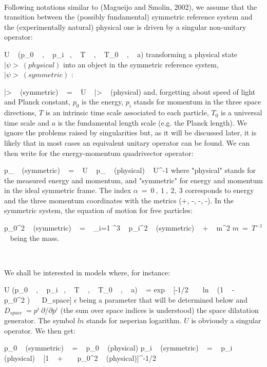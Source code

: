 \documentclass[a4paper,12pt,dvips]{article}
\begin{document}
~ 

Following notations similar to (Magueijo and Smolin, 2002), we assume that the transition between the (possibly fundamental) symmetric reference system and the (experimentally natural) physical one is driven by a singular non-unitary operator:

\equation
U ~ (p_0 ~ , ~ p_i ~, ~ T ~ , ~ T_0 ~ , ~ a) 
\endequation
\noindent
transforming a physical state $|\psi> ~ (physical)$ into an object in the symmetric reference system, $|\psi> ~ (symmetric)$ :

\equation
|\psi> ~ (symmetric) ~ = ~ U ~ |\psi> ~ (physical)
\endequation
\noindent
and, forgetting about speed of light and Planck constant, $p_0$ is the energy, $p_i$ stands for momentum in the three space directions, $T$ is an intrinsic time scale associated to each particle, $T_0$ is a universal time scale and $a$ is the fundamental length scale (e.g. the Planck length). We ignore the problems raised by singularities but, as it will be discussed later, it is likely that in most cases an equivalent unitary operator can be found. We can then write for the energy-momentum quadrivector operator:

\equation
p_{\alpha} ~ (symmetric) ~ = ~ U ~ p_{\alpha} ~ (physical) ~ U^{-1}
\endequation
\noindent
where "physical" stands for the measured energy and momentum, and "symmetric" for energy and momentum in the ideal symmetric frame. The index $\alpha ~ = ~ 0 ~ , ~ 1 ~ , ~ 2, ~ 3$ corresponds to energy and the three momentum coordinates with the metrics (+, -, -, -). 
\vskip 2mm
In the symmetric system, the equation of motion for free particles:

\equation
p_{0}^2 ~ (symmetric) ~ = ~ \Sigma _{i=1} ^3 ~ p_{i}^2 ~ (symmetric) ~ + ~ m^2
\endequation
\noindent
$m ~ = ~ T^{-1}$ ~ being the mass. 

~ 

We shall be interested in models where, for instance:

\equation
U (p_0 ~ , ~ p_i ~, ~ T ~ , ~ T_0 ~ , ~ a) ~ = exp ~ [-1/2 ~ ~ ln ~ (1 ~ - ~ \epsilon ~ p_0^2 ) ~ ~D_{space}]
\endequation
\noindent
$\epsilon $ being a parameter that will be determined below and $D_{space} ~ = p^i ~ \partial /\partial p^i$ (the sum over space indices is understood) the space dilatation generator. The symbol $ln$ stands for neperian logarithm. $U$ is obviously a singular operator. We then get:

\equation
p_{0} ~ (symmetric) ~ = ~ p_{0} ~ (physical)
\endequation
\equation
p_{i} ~ (symmetric) ~ = ~ p_{i} ~ (physical) 
~ [1 ~ + ~ \epsilon ~ p_0^2 ~ (physical)]^{-1/2}
\endequation
\end{document}
